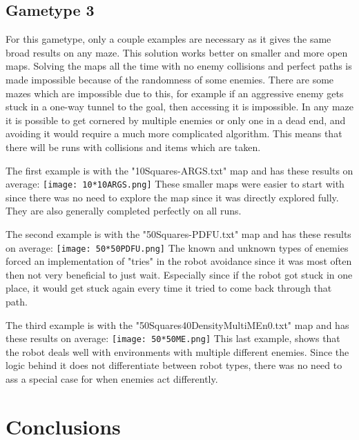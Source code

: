 \documentclass{cs255}
\begin{document}
\subsection{Gametype 3}

For this gametype, only a couple examples are necessary as it gives the same broad results on any maze.
This solution works better on smaller and more open maps.
Solving the maps all the time with no enemy collisions and perfect paths is made impossible because of the randomness of some enemies.
There are some mazes which are impossible due to this, for example if an aggressive enemy gets stuck in a one-way tunnel to the goal, then accessing it is impossible.
In any maze it is possible to get cornered by multiple enemies or only one in a dead end, and avoiding it would require a much more complicated algorithm.
This means that there will be runs with collisions and items which are taken.

The first example is with the "10Squares-ARGS.txt" map and has these results on average:\newline
\texttt{[image: 10*10ARGS.png]}\newline
These smaller maps were easier to start with since there was no need to explore the map since it was directly explored fully.
They are also generally completed perfectly on all runs.

The second example is with the "50Squares-PDFU.txt" map and has these results on average:\newline
\texttt{[image: 50*50PDFU.png]}\newline
The known and unknown types of enemies forced an implementation of "tries" in the robot avoidance since it was most often then not very beneficial to just wait.
Especially since if the robot got stuck in one place, it would get stuck again every time it tried to come back through that path.

The third example is with the "50Squares40DensityMultiMEn0.txt" map and has these results on average:\newline
\texttt{[image: 50*50ME.png]}\newline
This last example, shows that the robot deals well with environments with multiple different enemies.
Since the logic behind it does not differentiate between robot types, there was no need to ass a special case for when enemies act differently.

\section{Conclusions}
\end{document}
